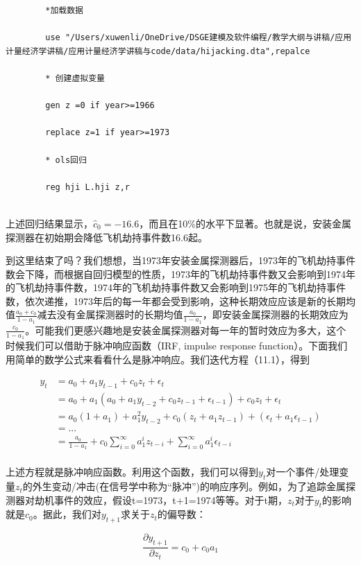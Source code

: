 \documentclass[cn,12pt,math=newtx,citestyle=gb7714-2015,bibstyle=gb7714-2015]{elegantbook}
\begin{document}
	\begin{lstlisting}
		*加载数据
		
		use "/Users/xuwenli/OneDrive/DSGE建模及软件编程/教学大纲与讲稿/应用计量经济学讲稿/应用计量经济学讲稿与code/data/hijacking.dta",repalce
		
		* 创建虚拟变量
		
		gen z =0 if year>=1966
		
		replace z=1 if year>=1973
		
		* ols回归
		
		reg hji L.hji z,r
		
	\end{lstlisting}
	
	上述回归结果显示，$\hat{c}_0=-16.6$，而且在10\%的水平下显著。也就是说，安装金属探测器在初始期会降低飞机劫持事件数16.6起。
	
	到这里结束了吗？我们想想，当1973年安装金属探测器后，1973年的飞机劫持事件数会下降，而根据自回归模型的性质，1973年的飞机劫持事件数又会影响到1974年的飞机劫持事件数，1974年的飞机劫持事件数又会影响到1975年的飞机劫持事件数，依次递推，1973年后的每一年都会受到影响，这种长期效应应该是新的长期均值$\frac{a_0+c_0}{1-a_1}$减去没有金属探测器时的长期均值$\frac{a_0}{1-a_1}$，即安装金属探测器的长期效应为$\frac{c_0}{1-a_1}$。可能我们更感兴趣地是安装金属探测器对每一年的暂时效应为多大，这个时候我们可以借助于脉冲响应函数（IRF, impulse response function）。下面我们用简单的数学公式来看看什么是脉冲响应。我们迭代方程（11.1），得到
	
	\begin{align*}
		y_t & = a_0 +a_1 y_{t-1} +c_0 z_t +\epsilon_t \\
		&  = a_0 +a_1 (a_0 +a_1 y_{t-2} +c_0 z_{t-1} +\epsilon_{t-1}) +c_0 z_t +\epsilon_t \\
		& = a_0(1 +a_1) + a_1^2 y_{t-2} +c_0 (z_t+a_1 z_{t-1})+(\epsilon_t+a_1 \epsilon_{t-1})\\
		& = ... \\
		& = \frac{a_0}{1-a_1} +c_0 \sum_{i=0}^{\infty}a_1^i z_{t-i} +\sum_{i=0}^{\infty}a_1^i \epsilon_{t-i}\\
	\end{align*}

    上述方程就是脉冲响应函数。利用这个函数，我们可以得到$y_t$对一个事件/处理变量$z_t$的外生变动/冲击(在信号学中称为“脉冲”)的响应序列。例如，为了追踪金属探测器对劫机事件的效应，假设t=1973，t+1=1974等等。对于t期，$z_t$对于$y_t$的影响就是$c_0$。据此，我们对$y_{t+1}$求关于$z_t$的偏导数：
    
    $$\frac{\partial y_{t+1}}{\partial z_t} = c_0+c_0a_1$$
\end{document}

